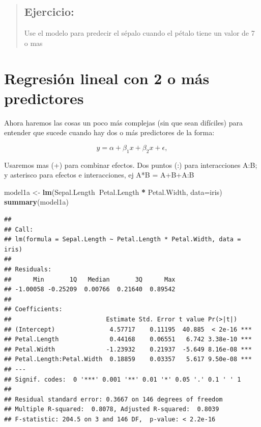 \documentclass[
]{book}
\newenvironment{Shaded}{\begin{snugshade}}{\end{snugshade}}
\newcommand{\DataTypeTok}[1]{\textcolor[rgb]{0.13,0.29,0.53}{#1}}
\newcommand{\KeywordTok}[1]{\textcolor[rgb]{0.13,0.29,0.53}{\textbf{#1}}}
\newcommand{\NormalTok}[1]{#1}
\newcommand{\OperatorTok}[1]{\textcolor[rgb]{0.81,0.36,0.00}{\textbf{#1}}}
\newcommand{\StringTok}[1]{\textcolor[rgb]{0.31,0.60,0.02}{#1}}
\begin{document}
\begin{quote}
\hypertarget{ejercicio-4}{%
\subsection{Ejercicio:}\label{ejercicio-4}}

Use el modelo para predecir el sépalo cuando el pétalo tiene un valor de 7 o mas
\end{quote}

\hypertarget{regresiuxf3n-lineal-con-2-o-muxe1s-predictores}{%
\section{Regresión lineal con 2 o más predictores}\label{regresiuxf3n-lineal-con-2-o-muxe1s-predictores}}

Ahora haremos las cosas un poco más complejas (sin que sean difíciles) para entender que sucede cuando hay dos o más predictores de la forma:

\begin{equation} 
y = \alpha +\beta_{1}\mathit{x} +\beta_{2}\mathit{x} +\epsilon,
  \label{eq:binom}
\end{equation}

Usaremos mas (+) para combinar efectos. Dos puntos (:) para interacciones A:B; y asterisco para efectos e interacciones, ej A*B = A+B+A:B

\begin{Shaded}
\begin{Highlighting}[]
\NormalTok{model1a <-}\StringTok{ }\KeywordTok{lm}\NormalTok{(Sepal.Length}\OperatorTok{~}\NormalTok{Petal.Length }\OperatorTok{*}\StringTok{ }\NormalTok{Petal.Width, }\DataTypeTok{data=}\NormalTok{iris)}
\KeywordTok{summary}\NormalTok{(model1a)}
\end{Highlighting}
\end{Shaded}

\begin{verbatim}
## 
## Call:
## lm(formula = Sepal.Length ~ Petal.Length * Petal.Width, data = iris)
## 
## Residuals:
##      Min       1Q   Median       3Q      Max 
## -1.00058 -0.25209  0.00766  0.21640  0.89542 
## 
## Coefficients:
##                          Estimate Std. Error t value Pr(>|t|)    
## (Intercept)               4.57717    0.11195  40.885  < 2e-16 ***
## Petal.Length              0.44168    0.06551   6.742 3.38e-10 ***
## Petal.Width              -1.23932    0.21937  -5.649 8.16e-08 ***
## Petal.Length:Petal.Width  0.18859    0.03357   5.617 9.50e-08 ***
## ---
## Signif. codes:  0 '***' 0.001 '**' 0.01 '*' 0.05 '.' 0.1 ' ' 1
## 
## Residual standard error: 0.3667 on 146 degrees of freedom
## Multiple R-squared:  0.8078, Adjusted R-squared:  0.8039 
## F-statistic: 204.5 on 3 and 146 DF,  p-value: < 2.2e-16
\end{verbatim}
\end{document}
